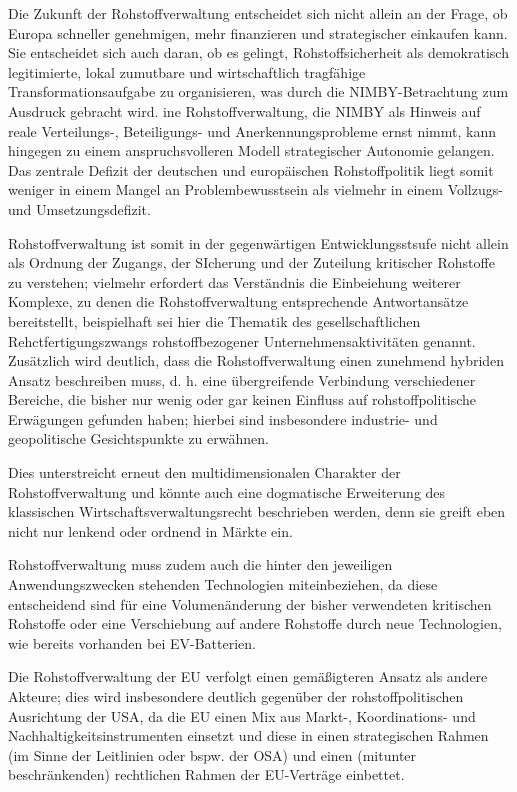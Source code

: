 \documentclass[12pt,a4paper,oneside]{book} %
\begin{document}
{Die Zukunft der Rohstoffverwaltung entscheidet sich nicht allein an der Frage, ob Europa schneller genehmigen, mehr finanzieren und strategischer einkaufen kann. Sie entscheidet sich auch daran, ob es gelingt, Rohstoffsicherheit als demokratisch legitimierte, lokal zumutbare und wirtschaftlich tragfähige Transformationsaufgabe zu organisieren, was durch die NIMBY-Betrachtung zum Ausdruck gebracht wird. ine Rohstoffverwaltung, die NIMBY als Hinweis auf reale Verteilungs-, Beteiligungs- und Anerkennungsprobleme ernst nimmt, kann hingegen zu einem anspruchsvolleren Modell strategischer Autonomie gelangen.
\\
Das zentrale Defizit der deutschen und europäischen Rohstoffpolitik liegt somit weniger in einem Mangel an Problembewusstsein als vielmehr in einem Vollzugs- und Umsetzungsdefizit.

Rohstoffverwaltung ist somit in der gegenwärtigen Entwicklungsstsufe nicht allein als Ordnung der Zugangs, der SIcherung und der Zuteilung kritischer Rohstoffe zu verstehen; vielmehr erfordert das Verständnis die Einbeiehung weiterer Komplexe, zu denen die Rohstoffverwaltung entsprechende Antwortansätze bereitstellt, beispielhaft sei hier die Thematik des gesellschaftlichen Rehctfertigungszwangs rohstoffbezogener Unternehmensaktivitäten genannt. Zusätzlich wird deutlich, dass die Rohstoffverwaltung einen zunehmend hybriden Ansatz beschreiben muss, d. h. eine übergreifende Verbindung verschiedener Bereiche, die bisher nur wenig oder gar keinen Einfluss auf rohstoffpolitische Erwägungen gefunden haben; hierbei sind insbesondere industrie- und geopolitische Gesichtspunkte zu erwähnen.

Dies unterstreicht erneut den multidimensionalen Charakter der Rohstoffverwaltung und könnte auch eine dogmatische Erweiterung des klassischen Wirtschaftsverwaltungsrecht beschrieben werden, denn sie greift eben nicht nur lenkend oder ordnend in Märkte ein.

Rohstoffverwaltung muss zudem auch die hinter den jeweiligen Anwendungszwecken stehenden Technologien miteinbeziehen, da diese entscheidend sind für eine Volumenänderung der bisher verwendeten kritischen Rohstoffe oder eine Verschiebung auf andere Rohstoffe durch neue Technologien, wie bereits vorhanden bei EV-Batterien.



Die Rohstoffverwaltung der EU verfolgt einen gemäßigteren Ansatz als andere Akteure; dies wird insbesondere deutlich gegenüber der rohstoffpolitischen Ausrichtung der USA, da die EU einen Mix aus Markt-, Koordinations- und Nachhaltigkeitsinstrumenten einsetzt und diese in einen strategischen Rahmen (im Sinne der Leitlinien oder bspw. der OSA) und einen (mitunter beschränkenden) rechtlichen Rahmen der EU-Verträge einbettet.

}
\end{document}
